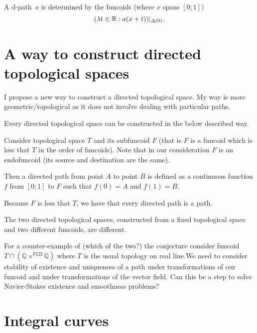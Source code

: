 \begin{conjecture}
A $\mathrm{d}$-path~$a$ is determined by the funcoids (where $x$ spans $[0;1]$)
\[ (\lambda t\in\mathbb{R}:a(x+t))|_{\Delta(0)}. \]
\end{conjecture}

\section{A way to construct directed topological spaces}

I propose a new way to construct a directed topological space. My way is more geometric/topological as it does not involve dealing with particular paths.

\begin{conjecture}
Every directed topological space can be constructed in the below described way.
\end{conjecture}

Consider topological space $T$ and its subfuncoid $F$ (that is $F$ is a funcoid which is less that $T$ in the order of funcoids).
Note that in our consideration $F$ is an endofuncoid (its source and destination are the same).

Then a directed path from point $A$ to point $B$ is defined as a continuous function $f$ from $[0;1]$ to $F$ such that $f(0)=A$ and $f(1)=B$.

Because $F$ is less that $T$, we have that every directed path is a path.

\begin{conjecture}
The two directed topological spaces, constructed from a fixed topological space and two different funcoids,
are different.
\end{conjecture}

For a counter-example of (which of the two?) the conjecture consider funcoid $T\sqcap(\mathbb{Q}\times^{\mathsf{FCD}}\mathbb{Q})$
where $T$ is the usual topology on real line.We need to consider stability of existence and uniqueness of a path under transformations of our funcoid and
under transformations of the vector field. Can this be a step to solve Navier-Stokes existence and smoothness problems?

\section{Integral curves}

